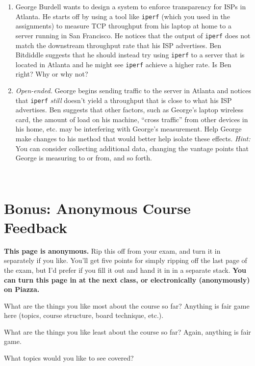 \documentclass[11pt]{article}
\newcommand{\ansbelow}{\probnote{Answer legibly in the space below.}}
\begin{document}
\begin{enumerate}
\item George Burdell wants to design a system to enforce transparency
  for ISPs in Atlanta.  He starts off by using a tool like {\tt iperf}
  (which you used in the assignments) to measure TCP throughput from his
  laptop at home to a server running in San Francisco.  He notices that
  the output of {\tt iperf} does not match the downstream throughput
  rate that his ISP advertises.  Ben Bitdiddle suggests that he should
  instead try using {\tt iperf} to a server that is located in Atlanta
  and he might see {\tt iperf} achieve a higher rate.  Is Ben right?
  Why or why not?
\item {\em Open-ended.} George begins sending traffic to the server in Atlanta and notices
  that {\tt iperf} {\em still} doesn't yield a throughput that is close
  to what his ISP advertises.  Ben suggests that other factors, such as
  George's laptop wireless card, the amount of load on his machine,
  ``cross traffic'' from other devices in his home, etc. may be
  interfering with George's measurement.  Help George make changes to
  his method that would better help isolate these effects.  {\em Hint:} You can
  consider collecting additional data, changing the vantage points that
  George is measuring to or from, and so forth.
\end{enumerate}
~\ansbelow \eprob


\newpage
\section{Bonus: Anonymous Course Feedback}

{\bf This page is anonymous.}  Rip this off from your exam, and turn it
in separately if you like.  You'll get five points for simply ripping
off the last page of the exam, but I'd prefer if you fill it out and
hand it in in a separate stack.  {\bf You can turn this page in at the next
class, or electronically (anonymously) on Piazza.}
\vspace{.5in}

What are the things you like most about the course so far?  Anything is
fair game here (topics, course structure, board technique, etc.).
\vspace{1.5in}


What are the things you like least about the course so far?  Again,
anything is fair game.
\vspace{1in}


What topics would you like to see covered?
\vspace{1in}




\label{lastpage}
\end{document}
